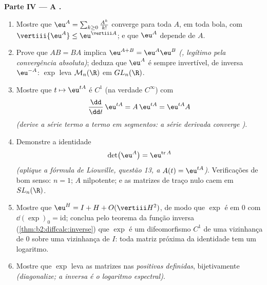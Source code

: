 \begin{problem}
\medskip
\noindent\textbf{Parte IV --- A .}
\begin{enumerate}[resume]
  \item Mostre que $\eu^A = \sum_{k\geq0}\frac{A^k}{k!}$
        converge  para toda $A$,  em toda
        bola, com $\vertiii{\eu^A} \leq
        \eu^{\vertiii A}$; e que $\eu^A$ depende
         de $A$.
  \item Prove que $AB = BA$ implica $\eu^{A+B} =
        \eu^A\eu^B$ \emph{(, legítimo pela
        convergência absoluta)}; deduza que $\eu^A$ é sempre
        invertível, de inversa $\eu^{-A}$: $\exp$ leva
        $\mathcal M_n(\R)$ em $GL_n(\R)$.
  \item Mostre que $t \mapsto \eu^{tA}$ é $C^1$ (na verdade
        $C^\infty$) com
        \[
        \frac{\dd}{\dd t}\,\eu^{tA} = A\,\eu^{tA} =
        \eu^{tA}A
        \]
        \emph{(derive a série termo a termo em segmentos: a
        série derivada converge )}.
  \item Demonstre a identidade
        \[
        \det\bigl(\eu^{A}\bigr) = \eu^{\operatorname{tr}A}
        \]
        \emph{(aplique a fórmula de Liouville, questão 13, a
        $A(t) = \eu^{tA}$)}. Verificações de bom senso: $n = 1$; $A$
        nilpotente; e as matrizes de traço nulo caem em
        $SL_n(\R)$.
  \item Mostre que $\eu^H = I + H + O(\vertiii H^2)$, de modo que $\exp$ é
         em $0$ com $\dd(\exp)_0 =
        \mathrm{id}$; conclua pelo teorema da função
        inversa (\cref{thm:b2:diffcalc:inverse}) que $\exp$
        é um difeomorfismo $C^1$ de uma vizinhança de $0$
        sobre uma vizinhança de $I$: toda matriz próxima da
        identidade tem um logaritmo.
  \item Mostre que $\exp$ leva as matrizes  nas 
        \emph{positivas definidas}, bijetivamente
        \emph{(diagonalize; a inversa é o logaritmo
        espectral)}.
\end{enumerate}


\end{problem}

